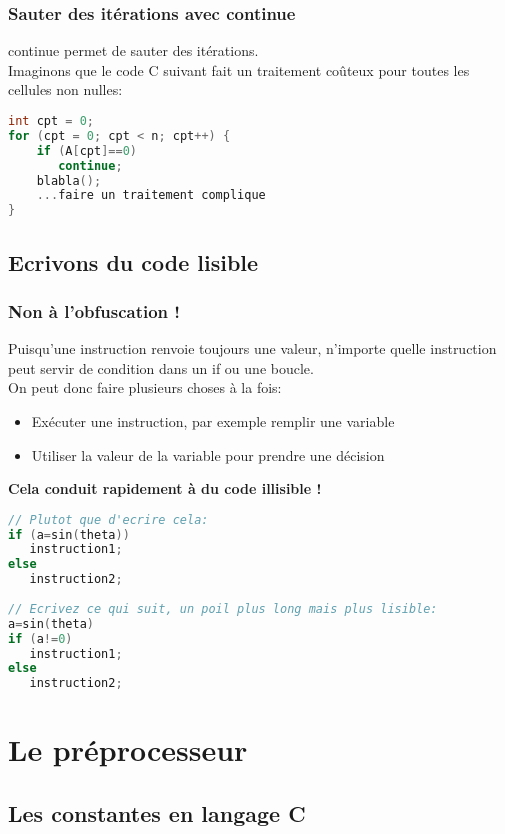 \documentclass{beamer}
\begin{document}
\begin{frame}[fragile=singleslide,shrink=20]
\frametitle {Sauter des itérations avec continue}
continue permet de sauter des itérations. \\
Imaginons que le code C suivant fait un traitement coûteux pour toutes les cellules non nulles:
\begin{lstlisting}[language=c++]
int cpt = 0;
for (cpt = 0; cpt < n; cpt++) {
    if (A[cpt]==0)
       continue;
    blabla();
    ...faire un traitement complique
}
\end{lstlisting}
\end{frame}

\subsection{Ecrivons du code lisible}

\begin{frame}[fragile=singleslide,shrink=20]
\frametitle {Non à l'obfuscation !}
Puisqu'une instruction renvoie toujours une valeur, n'importe quelle instruction \\
peut servir de condition dans un if ou une boucle.\\
On peut donc faire plusieurs choses à la fois:
\begin{itemize}
\item{Exécuter une instruction, par exemple remplir une variable}
\item{Utiliser la valeur de la variable pour prendre une décision}
\end{itemize}

\textbf{Cela conduit rapidement à du code illisible !}

\begin{lstlisting}[language=c++]
// Plutot que d'ecrire cela:
if (a=sin(theta))
   instruction1;
else
   instruction2;
   
// Ecrivez ce qui suit, un poil plus long mais plus lisible:
a=sin(theta)
if (a!=0)
   instruction1;
else
   instruction2;
\end{lstlisting}
\end{frame}

\section{Le préprocesseur}

\subsection{Les constantes en langage C}
\end{document}
